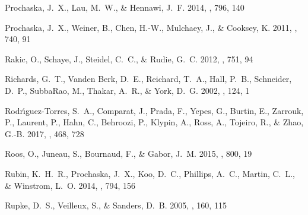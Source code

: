 \documentclass[iop]{emulateapj}
\begin{document}
\begin{thebibliography}{45}
{Prochaska}, J.~X., {Lau}, M.~W., \& {Hennawi}, J.~F. 2014, \apj, 796, 140

{Prochaska}, J.~X., {Weiner}, B., {Chen}, H.-W., {Mulchaey}, J., \& {Cooksey},
  K. 2011, \apj, 740, 91

{Rakic}, O., {Schaye}, J., {Steidel}, C.~C., \& {Rudie}, G.~C. 2012, \apj, 751,
  94

{Richards}, G.~T., {Vanden Berk}, D.~E., {Reichard}, T.~A., {Hall}, P.~B.,
  {Schneider}, D.~P., {SubbaRao}, M., {Thakar}, A.~R., \& {York}, D.~G. 2002,
  \aj, 124, 1

{Rodr{\'{\i}}guez-Torres}, S.~A., {Comparat}, J., {Prada}, F., {Yepes}, G.,
  {Burtin}, E., {Zarrouk}, P., {Laurent}, P., {Hahn}, C., {Behroozi}, P.,
  {Klypin}, A., {Ross}, A., {Tojeiro}, R., \& {Zhao}, G.-B. 2017, \mnras, 468,
  728

{Roos}, O., {Juneau}, S., {Bournaud}, F., \& {Gabor}, J.~M. 2015, \apj, 800, 19

{Rubin}, K.~H.~R., {Prochaska}, J.~X., {Koo}, D.~C., {Phillips}, A.~C.,
  {Martin}, C.~L., \& {Winstrom}, L.~O. 2014, \apj, 794, 156

{Rupke}, D.~S., {Veilleux}, S., \& {Sanders}, D.~B. 2005, \apjs, 160, 115


\end{thebibliography}
\end{document}
